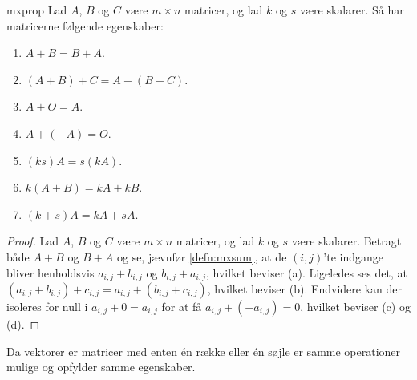 %
\begin{thm}{}{mxprop}
Lad $A$, $B$ og $C$ være $m \times n$ matricer, og lad $k$ og $s$ være skalarer.
Så har matricerne følgende egenskaber:
\begin{enumerate}[label=(\alph*)]
\item $A + B = B + A$.
\item $(A + B) + C = A + (B + C)$.
\item $A + O = A$.
\item $A + (-A) = O$.
\item $(ks)A = s(kA)$.
\item $k(A + B) = kA + kB$.
\item $(k + s)A = kA + sA$.
\end{enumerate}
\end{thm}
%
\begin{proof}
Lad $A$, $B$ og $C$ være $m \times n$ matricer, og lad $k$ og $s$ være skalarer.
Betragt både $A + B$ og $B + A$ og se, jævnfør \ref{defn:mxsum}, at de $(i,j)$'te indgange bliver henholdsvis $a_{i,j} + b_{i,j}$ og $b_{i,j} + a_{i,j}$, hvilket beviser (a).
Ligeledes ses det, at $(a_{i,j} + b_{i,j}) + c_{i,j} = a_{i,j} + (b_{i,j} + c_{i,j})$, hvilket beviser (b).
Endvidere kan der isoleres for null i $a_{i,j} + 0 = a_{i,j}$ for at få $a_{i,j} + (-a_{i,j}) = 0$, hvilket beviser (c) og (d).


\end{proof}

Da vektorer er matricer med enten én række eller én søjle er samme operationer mulige og opfylder samme egenskaber.
